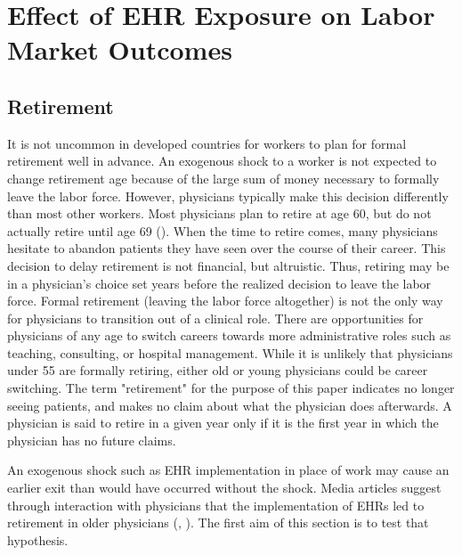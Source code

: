 \documentclass[11pt]{article}
\begin{document}
\section{Effect of EHR Exposure on Labor Market Outcomes}

\subsection{Retirement}

It is not uncommon in developed countries for workers to plan for formal retirement well in advance. An exogenous shock to a worker is not expected to change retirement age because of the large sum of money necessary to formally leave the labor force. However, physicians typically make this decision differently than most other workers. Most physicians plan to retire at age 60, but do not actually retire until age 69 (\cite{collier2017challenges}). When the time to retire comes, many physicians hesitate to abandon patients they have seen over the course of their career. This decision to delay retirement is not financial, but altruistic. Thus, retiring may be in a physician's choice set years before the realized decision to leave the labor force. Formal retirement (leaving the labor force altogether) is not the only way for physicians to transition out of a clinical role. There are opportunities for physicians of any age to switch careers towards more administrative roles such as teaching, consulting, or hospital management. While it is unlikely that physicians under 55 are formally retiring, either old or young physicians could be career switching. The term "retirement" for the purpose of this paper indicates no longer seeing patients, and makes no claim about what the physician does afterwards. A physician is said to retire in a given year only if it is the first year in which the physician has no future claims.

An exogenous shock such as EHR implementation in place of work may cause an earlier exit than would have occurred without the shock. Media articles suggest through interaction with physicians that the implementation of EHRs led to retirement in older physicians (\cite{ringel_2019}, \cite{loria_2020}). The first aim of this section is to test that hypothesis. 
\end{document}
